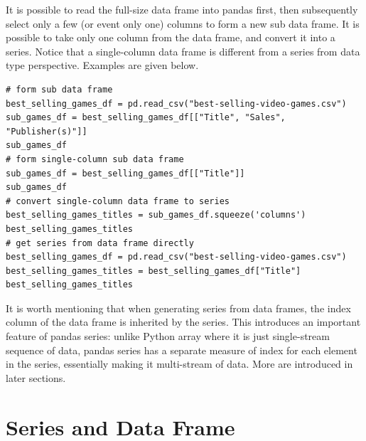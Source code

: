 It is possible to read the full-size data frame into pandas first, then subsequently select only a few (or event only one) columns to form a new sub data frame. It is possible to take only one column from the data frame, and convert it into a series. Notice that a single-column data frame is different from a series from data type perspective. Examples are given below.
\begin{lstlisting}
# form sub data frame
best_selling_games_df = pd.read_csv("best-selling-video-games.csv")
sub_games_df = best_selling_games_df[["Title", "Sales", "Publisher(s)"]]
sub_games_df
# form single-column sub data frame
sub_games_df = best_selling_games_df[["Title"]]
sub_games_df
# convert single-column data frame to series
best_selling_games_titles = sub_games_df.squeeze('columns')
best_selling_games_titles
# get series from data frame directly
best_selling_games_df = pd.read_csv("best-selling-video-games.csv")
best_selling_games_titles = best_selling_games_df["Title"]
best_selling_games_titles
\end{lstlisting}

It is worth mentioning that when generating series from data frames, the index column of the data frame is inherited by the series. This introduces an important feature of pandas series: unlike Python array where it is just single-stream sequence of data, pandas series has a separate measure of index for each element in the series, essentially making it multi-stream of data. More are introduced in later sections.

\section{Series and Data Frame}

